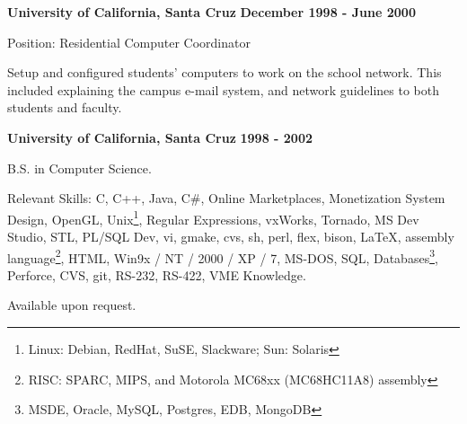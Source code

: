 \documentclass{article}
\begin{document}
\vspace{\baselineskip}
{\bf University of California, Santa Cruz} 
\hfill {\bf December 1998 - June 2000}
\par
Position:  Residential Computer Coordinator
\par
\vspace{.03in}
Setup and configured students' computers to work on the school network.
This included explaining the campus e-mail system, and network guidelines 
to both students and faculty.
\par
\vspace{2\baselineskip}
{\bf University of California, Santa Cruz} 
\hspace*{\fill} {\bf 1998 - 2002}
\par
\vspace{.03in}
B.S. in Computer Science.

\vspace{\baselineskip}
Relevant Skills:  C, C++, Java, C\#, Online Marketplaces, Monetization System
Design, OpenGL, Unix\footnote{Linux: Debian, RedHat, SuSE, Slackware;
Sun: Solaris}, Regular Expressions, vxWorks, Tornado, MS Dev Studio, STL, PL/SQL Dev, vi, gmake, cvs, sh, perl, 
flex, bison, \LaTeX, assembly language\footnote{RISC: SPARC, MIPS, and Motorola MC68xx (MC68HC11A8)
assembly}, HTML, Win9x / NT / 2000 / XP / 7, MS-DOS, SQL,
Databases\footnote{MSDE, Oracle, MySQL, Postgres, EDB, MongoDB}, Perforce, CVS, git, RS-232, RS-422, VME Knowledge.
\vspace{2\baselineskip}

\par

Available upon request.
\end{document}
